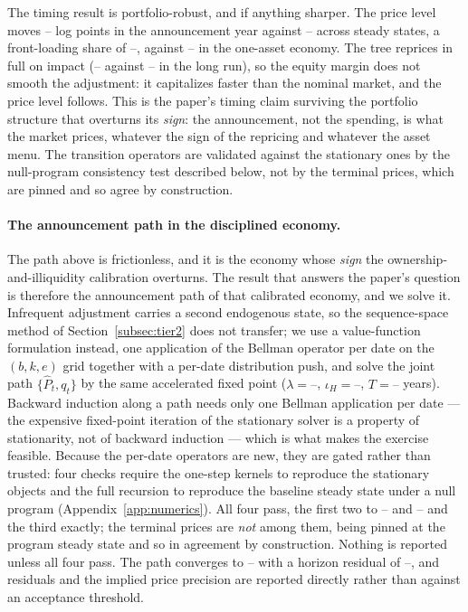 \documentclass[12pt]{article}
\providecommand{\pendingnum}{\textit{--}}
\providecommand{\KVTrT}{\pendingnum}\providecommand{\KVTrLam}{\pendingnum}
\providecommand{\KVTrIota}{\pendingnum}\providecommand{\KVTrMargin}{\pendingnum}
\providecommand{\KVTrResid}{\pendingnum}\providecommand{\KVTrTerm}{\pendingnum}
\providecommand{\KVTrGateB}{\pendingnum}\providecommand{\KVTrGateK}{\pendingnum}
\providecommand{\TwoTrImpP}{\pendingnum}\providecommand{\TwoTrLongP}{\pendingnum}
\providecommand{\TwoTrShare}{\pendingnum}\providecommand{\TwoTrImpQ}{\pendingnum}
\providecommand{\TwoTrLongQ}{\pendingnum}\providecommand{\OneTrShare}{\pendingnum}
\begin{document}
The timing result is portfolio-robust, and if anything sharper. The price
level moves $\TwoTrImpP$ log points in the announcement year against
$\TwoTrLongP$ across steady states, a front-loading share of
$\TwoTrShare$, against $\OneTrShare$ in the one-asset economy. The tree
reprices in full on impact ($\TwoTrImpQ$ against $\TwoTrLongQ$ in the long
run), so the equity margin does not smooth the adjustment: it capitalizes
faster than the nominal market, and the price level follows. This is the
paper's timing claim surviving the portfolio structure that overturns its
\emph{sign}: the announcement, not the spending, is what the market prices,
whatever the sign of the repricing and whatever the asset menu. The
transition operators are validated against the stationary ones by the
null-program consistency test described below, not by the terminal prices,
which are pinned and so agree by construction.

\paragraph{The announcement path in the disciplined economy.} The path
above is frictionless, and it is the economy whose \emph{sign} the
ownership-and-illiquidity calibration overturns. The result that answers
the paper's question is therefore the announcement path of that calibrated
economy, and we solve it. Infrequent adjustment carries a second endogenous
state, so the sequence-space method of Section~\ref{subsec:tier2} does not
transfer; we use a value-function formulation instead, one application of
the Bellman operator per date on the $(b,k,e)$ grid together with a per-date
distribution push, and solve the joint path $\{\hat P_t, q_t\}$ by the same
accelerated fixed point ($\lambda=\KVTrLam$, $\iota_H=\KVTrIota$,
$T=\KVTrT$ years). Backward induction along a path needs
only one Bellman application per date --- the expensive fixed-point
iteration of the stationary solver is a property of stationarity, not of
backward induction --- which is what makes the exercise feasible. Because
the per-date operators are new, they are gated rather than trusted: four
checks require the one-step kernels to reproduce the stationary objects and
the full recursion to reproduce the baseline steady state under a null
program (Appendix~\ref{app:numerics}). All four pass, the first two to
$\KVTrGateB$ and $\KVTrGateK$ and the third exactly; the terminal prices are
\emph{not} among them, being pinned at the program steady state and so in
agreement by construction. Nothing is reported unless all four pass. The
path converges to $\KVTrResid$ with a horizon residual of $\KVTrTerm$, and
residuals and the implied price precision are reported directly rather than
against an acceptance threshold.
\end{document}
